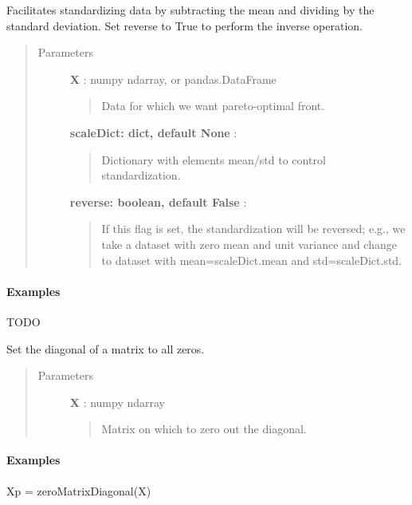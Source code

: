 \documentclass[letterpaper,10pt,english]{sphinxmanual}
\begin{document}
\begin{fulllineitems}
\label{qikify:qikify.helpers.standardize}
Facilitates standardizing data by subtracting the mean and dividing by
the standard deviation. Set reverse to True to perform the inverse 
operation.
\begin{quote}\begin{description}
\item[{Parameters }] \leavevmode
\textbf{X} : numpy ndarray, or pandas.DataFrame
\begin{quote}

Data for which we want pareto-optimal front.
\end{quote}

\textbf{scaleDict: dict, default None} :
\begin{quote}

Dictionary with elements mean/std to control standardization.
\end{quote}

\textbf{reverse: boolean, default False} :
\begin{quote}

If this flag is set, the standardization will be reversed; e.g.,
we take a dataset with zero mean and unit variance and change to
dataset with mean=scaleDict.mean and std=scaleDict.std.
\end{quote}

\end{description}\end{quote}
\paragraph{Examples}

TODO

\end{fulllineitems}


\begin{fulllineitems}
\label{qikify:qikify.helpers.zeroMatrixDiagonal}
Set the diagonal of a matrix to all zeros.
\begin{quote}\begin{description}
\item[{Parameters }] \leavevmode
\textbf{X} : numpy ndarray
\begin{quote}

Matrix on which to zero out the diagonal.
\end{quote}

\end{description}\end{quote}
\paragraph{Examples}

Xp = zeroMatrixDiagonal(X)

\end{fulllineitems}
\end{document}
